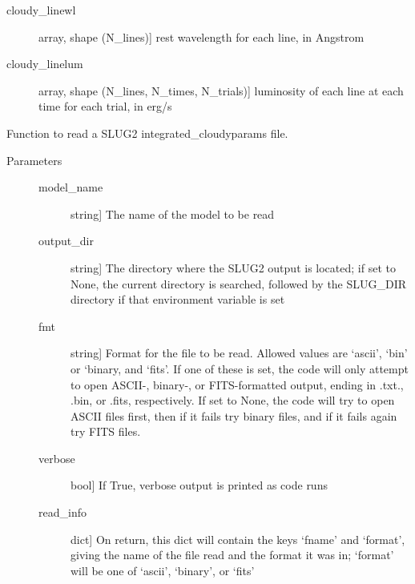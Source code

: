\documentclass[letterpaper,10pt,english]{sphinxmanual}
\begin{document}
\begin{fulllineitems}
\begin{description}
\begin{description}
\item[{cloudy\_linewl}] \leavevmode{[}array, shape (N\_lines){]}
rest wavelength for each line, in Angstrom

\item[{cloudy\_linelum}] \leavevmode{[}array, shape (N\_lines, N\_times, N\_trials){]}
luminosity of each line at each time for each trial, in erg/s

\end{description}

\end{description}

\end{fulllineitems}


\begin{fulllineitems}
\label{cloudy:slugpy.cloudy.read_integrated_cloudyparams}
Function to read a SLUG2 integrated\_cloudyparams file.
\begin{description}
\item[{Parameters}] \leavevmode\begin{description}
\item[{model\_name}] \leavevmode{[}string{]}
The name of the model to be read

\item[{output\_dir}] \leavevmode{[}string{]}
The directory where the SLUG2 output is located; if set to None,
the current directory is searched, followed by the SLUG\_DIR
directory if that environment variable is set

\item[{fmt}] \leavevmode{[}string{]}
Format for the file to be read. Allowed values are `ascii',
`bin' or `binary, and `fits'. If one of these is set, the code
will only attempt to open ASCII-, binary-, or FITS-formatted
output, ending in .txt., .bin, or .fits, respectively. If set
to None, the code will try to open ASCII files first, then if
it fails try binary files, and if it fails again try FITS
files.

\item[{verbose}] \leavevmode{[}bool{]}
If True, verbose output is printed as code runs

\item[{read\_info}] \leavevmode{[}dict{]}
On return, this dict will contain the keys `fname' and
`format', giving the name of the file read and the format it
was in; `format' will be one of `ascii', `binary', or `fits'


\end{description}
\end{description}
\end{fulllineitems}
\end{document}
